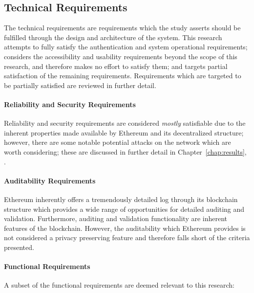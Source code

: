 \subsection{Technical Requirements}
The technical requirements are requirements which the study asserts should be
fulfilled through the design and architecture of the system. This research
attempts to fully satisfy the authentication and system operational
requirements; considers the accessibility and usability requirements beyond the
scope of this research, and therefore makes no effort to satisfy them; and
targets partial satisfaction of the remaining requirements. Requirements which
are targeted to be partially satisfied are reviewed in further detail.

\paragraph{Reliability and Security Requirements}
Reliability and security requirements are considered \emph{mostly} satisfiable
due to the inherent properties made available by Ethereum and its decentralized
structure; however, there are some notable potential attacks on the network
which are worth considering; these are discussed in further detail in
Chapter~\ref{chap:results}, \emph{}.

\paragraph{Auditability Requirements}
Ethereum inherently offers a tremendously detailed log through its blockchain
structure which provides a wide range of opportunities for detailed auditing and
validation. Furthermore, auditing and validation functionality are inherent
features of the blockchain. However, the auditability which Ethereum provides is
not considered a privacy preserving feature and therefore falls short of the
criteria presented.

\paragraph{Functional Requirements}
A subset of the functional requirements are deemed relevant to this research:

